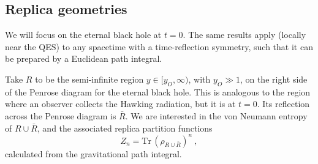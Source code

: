 \documentclass[12pt,oneside,letterpaper]{article}
\newcommand{\be}{\begin{equation}}
\newcommand{\ee}{\end{equation}}
\def\be{\begin{eqnarray}}
\def\ee{\end{eqnarray}}
\newcommand{\tr}{\textrm{Tr}\,}
\def\be{\begin{equation}}
\def\ee{\end{equation}}
\numberwithin{equation}{section}
\def \be {\begin{equation}}
\def \ee {\end{equation}}
\begin{document}
\subsection{Replica geometries}

We will focus on the eternal black hole at $t=0$. The same results apply (locally near the QES) to any spacetime with a time-reflection symmetry, such that it can be prepared by a Euclidean path integral.

Take $R$ to be the semi-infinite region $y \in [y_O, \infty)$, with $y_O \gg 1$, on the right side of the Penrose diagram for the eternal black hole. This is analogous to the region where an observer collects the Hawking radiation, but it is at $t=0$. Its reflection across the Penrose diagram is $\bar{R}$. We are interested in the von Neumann entropy of $R \cup \bar{R}$, and the associated replica partition functions
\be
Z_n = \tr (\rho_{R \cup \bar{R}})^n \ ,
\ee
calculated from the gravitational path integral.
\end{document}
